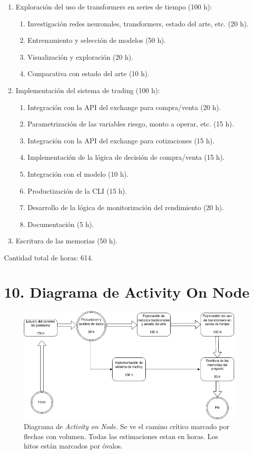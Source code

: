 \documentclass[
    11pt, %
]{charter}
\begin{document}
\begin{enumerate}
    \item Exploración del uso de transformers en series de tiempo (100 h):
      \begin{enumerate}
      \item Investigación redes neuronales, transformers, estado del arte, etc. (20 h).
      \item Entrenamiento y selección de modelos (50 h).
      \item Visualización y exploración (20 h).
      \item Comparativa con estado del arte (10 h).
      \end{enumerate}

    \item Implementación del sistema de trading (100 h):
      \begin{enumerate}
      \item Integración con la API del exchange para compra/venta (20 h).
      \item Parametrización de las variables riesgo, monto a operar, etc. (15 h).
      \item Integración con la API del exchange para cotizaciones (15 h).
      \item Implementación de la lógica de decisión de compra/venta (15 h).
      \item Integración con el modelo (10 h).
      \item Productización de la CLI (15 h).
      \item Desarrollo de la lógica de monitorización del rendimiento (20 h).
      \item Documentación (5 h).
      \end{enumerate}

    \item Escritura de las memorias (50 h).
    \end{enumerate}

    Cantidad total de horas: 614.
    \section{10. Diagrama de Activity On Node}
    \label{sec:AoN}


    \begin{figure}[htpb]
      \centering
      \includegraphics[width=.95\textwidth]{./Figuras/aon.drawio.png}
      \caption{Diagrama de \textit{Activity on Node}. Se ve el camino crítico marcado por flechas con volumen. Todas las estimaciones estan en horas. Los hitos están marcados por óvalos.}
      \label{fig:AoN}
    \end{figure}
\end{document}
